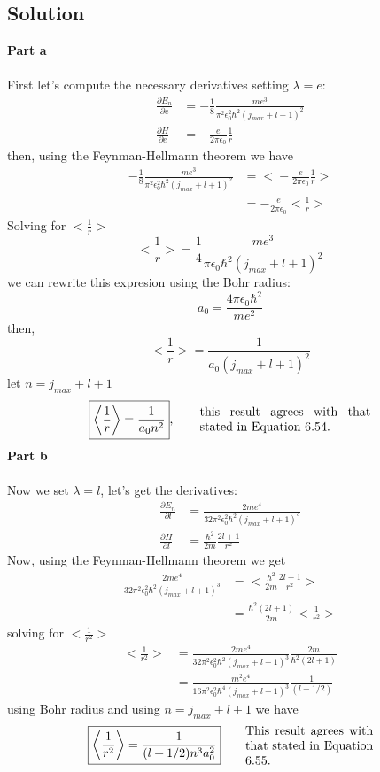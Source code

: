 \documentclass[12 pt]{article}
\numberwithin{equation}{section}
\begin{document}
\subsection*{Solution}
\textbf{Part a}\\
\\
First let's compute the necessary derivatives setting $\lambda = e$:
\begin{align*}
  \frac{\partial E_n}{\partial e} &= -\frac{1}{8}\frac{me^3}{\pi^2\epsilon_0^2\hbar^2
  (j_{max}+l+1)^2} \\
  \frac{\partial H}{\partial e} &= -\frac{e}{2\pi\epsilon_0}\frac{1}{r}
\end{align*}
then, using the Feynman-Hellmann theorem we have 
\begin{align*}
  -\frac{1}{8}\frac{me^3}{\pi^2\epsilon_0^2\hbar^2
  (j_{max}+l+1)^2} &= \bigg< -\frac{e}{2\pi\epsilon_0}\frac{1}{r}\bigg>\\
                   &= -\frac{e}{2\pi\epsilon_0}\bigg<\frac{1}{r}\bigg>
\end{align*}
Solving for $\bigg<\frac{1}{r}\bigg>$
\[
  \bigg<\frac{1}{r}\bigg> = \frac{1}{4}\frac{me^3}{\pi\epsilon_0\hbar^2(j_{max}+l+1)^2}
\]
we can rewrite this expresion using the Bohr radius:
\[
  a_0 = \frac{4\pi\epsilon_0\hbar^2}{me^2}
\]
then, 
\[
  \bigg<\frac{1}{r}\bigg> = \frac{1}{a_0(j_{max}+l+1)^2}
\]
let $n = j_{max}+l+1$
\[
  \boxed{\bigg<\frac{1}{r}\bigg> = \frac{1}{a_0 n^2}},\qquad \parbox{0.4\textwidth}{
    this result agrees with that stated in Equation 6.54.
  }
\]
\textbf{Part b}\\
\\
Now we set $\lambda = l$, let's get the derivatives: 
\begin{align*}
  \frac{\partial E_n}{\partial l} &= \frac{2me^4}{32\pi^2\epsilon_0^2\hbar^2(j_{max}+l+1)^3}\\
  \frac{\partial H}{\partial l}&= \frac{\hbar^2}{2m} \frac{2l+1}{r^2}
\end{align*}
Now, using the Feynman-Hellmann theorem we get 
\begin{align*}
 \frac{2me^4}{32\pi^2\epsilon_0^2\hbar^2(j_{max}+l+1)^3}
 &= \bigg<\frac{\hbar^2}{2m} \frac{2l+1}{r^2} \bigg>\\
 &=\frac{\hbar^2(2l+1)}{2m}\bigg<\frac{1}{r^2} \bigg>
\end{align*}
solving for $\bigg<\frac{1}{r^2}\bigg>$
\begin{align*}
  \bigg<\frac{1}{r^2}\bigg>&= \frac{2me^4}{32\pi^2\epsilon_0^2\hbar^2(j_{max}+l+1)^3}
  \frac{2m}{\hbar^2(2l+1)}\\
                           &= \frac{m^2e^4}{16\pi^2\epsilon_0^2\hbar^4
                           (j_{max}+l+1)^3}\frac{1}{(l+1/2)}
\end{align*}
using Bohr radius and using $n = j_{max}+l+1$ we have
\[
  \boxed{ \bigg<\frac{1}{r^2}\bigg> =\frac{1}{(l+1/2)n^3a_0^2} } 
  \qquad \parbox{0.3\textwidth}{This result agrees with that stated in Equation 6.55.}
\]
\end{document}
